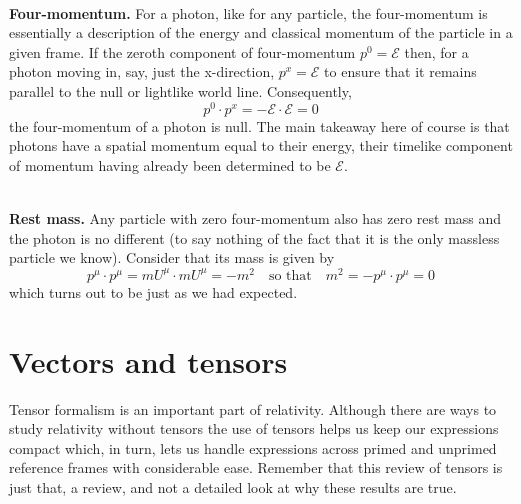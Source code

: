 \documentclass[english,seminar]{lecture}
\newcommand{\E}{\mathscr{E}}
\begin{document}
\\\textbf{Four-momentum.} For a photon, like for any particle, the four-momentum is essentially a description of the energy and classical momentum of the particle in a given frame. If the zeroth component of four-momentum $p^0 = \E$ then, for a photon moving in, say, just the x-direction, $p^x = \E$ to ensure that it remains parallel to the null or lightlike world line. Consequently,
\[
p^0\cdot p^x = -\E\cdot \E = 0
\]
the four-momentum of a photon is null. The main takeaway here of course is that photons have a spatial momentum equal to their energy, their timelike component of momentum having already been determined to be $\E$.

\\\textbf{Rest mass.} Any particle with zero four-momentum also has zero rest mass and the photon is no different (to say nothing of the fact that it is the only massless particle we know). Consider that its mass is given by
\[
p^\mu\cdot p^\mu = mU^\mu \cdot mU^\mu = -m^2
\quad\textrm{so that}\quad
m^2 = -p^\mu\cdot p^\mu = 0
\]
which turns out to be just as we had expected.

\section{Vectors and tensors}

Tensor formalism is an important part of relativity. Although there are ways to study relativity without tensors the use of tensors helps us keep our expressions compact which, in turn, lets us handle expressions across primed and unprimed reference frames with considerable ease. Remember that this review of tensors is just that, a review, and not a detailed look at why these results are true.
\end{document}
